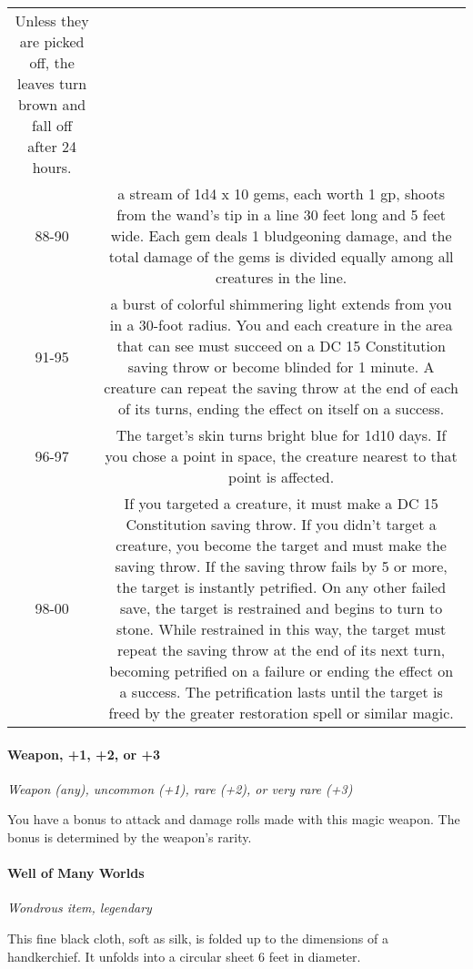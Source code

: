 \documentclass[
]{article}
\begin{document}
\begin{longtable}[]{@{}cc@{}}
Unless they are picked off, the leaves turn brown and fall off after 24
hours.\tabularnewline
88-90 & a stream of 1d4 x 10 gems, each worth 1 gp, shoots from the
wand's tip in a line 30 feet long and 5 feet wide. Each gem deals 1
bludgeoning damage, and the total damage of the gems is divided equally
among all creatures in the line.\tabularnewline
91-95 & a burst of colorful shimmering light extends from you in a
30-foot radius. You and each creature in the area that can see must
succeed on a DC 15 Constitution saving throw or become blinded for 1
minute. A creature can repeat the saving throw at the end of each of its
turns, ending the effect on itself on a success.\tabularnewline
96-97 & The target's skin turns bright blue for 1d10 days. If you chose
a point in space, the creature nearest to that point is
affected.\tabularnewline
98-00 & If you targeted a creature, it must make a DC 15 Constitution
saving throw. If you didn't target a creature, you become the target and
must make the saving throw. If the saving throw fails by 5 or more, the
target is instantly petrified. On any other failed save, the target is
restrained and begins to turn to stone. While restrained in this way,
the target must repeat the saving throw at the end of its next turn,
becoming petrified on a failure or ending the effect on a success. The
petrification lasts until the target is freed by the greater restoration
spell or similar magic.\tabularnewline
\bottomrule
\end{longtable}

\hypertarget{weapon-1-2-or-3}{%
\paragraph{Weapon, +1, +2, or +3}\label{weapon-1-2-or-3}}

\emph{Weapon (any), uncommon (+1), rare (+2), or very rare (+3)}

You have a bonus to attack and damage rolls made with this magic weapon.
The bonus is determined by the weapon's rarity.

\hypertarget{well-of-many-worlds}{%
\paragraph{Well of Many Worlds}\label{well-of-many-worlds}}

\emph{Wondrous item, legendary}

This fine black cloth, soft as silk, is folded up to the dimensions of a
handkerchief. It unfolds into a circular sheet 6 feet in diameter.
\end{document}
